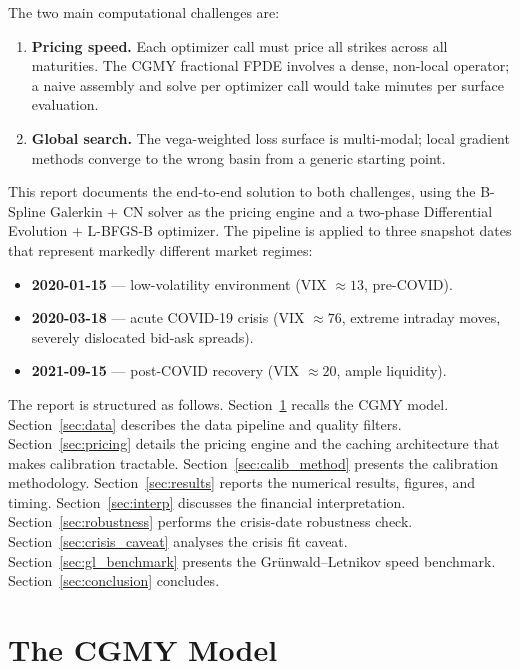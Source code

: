 \documentclass[11pt,a4paper]{article}
\begin{document}
The two main computational challenges are:
\begin{enumerate}[leftmargin=*]
  \item \textbf{Pricing speed.} Each optimizer call must price all strikes
        across all maturities.  The CGMY fractional FPDE involves a dense,
        non-local operator; a naive assembly and solve per optimizer call would
        take minutes per surface evaluation.
  \item \textbf{Global search.} The vega-weighted loss surface is multi-modal;
        local gradient methods converge to the wrong basin from a generic
        starting point.
\end{enumerate}

This report documents the end-to-end solution to both challenges, using the
B-Spline Galerkin + CN solver as the pricing engine and a two-phase
Differential Evolution + L-BFGS-B optimizer.
The pipeline is applied to three snapshot dates that represent markedly
different market regimes:
\begin{itemize}
  \item \textbf{2020-01-15} — low-volatility environment (VIX $\approx 13$,
        pre-COVID).
  \item \textbf{2020-03-18} — acute COVID-19 crisis (VIX $\approx 76$,
        extreme intraday moves, severely dislocated bid-ask spreads).
  \item \textbf{2021-09-15} — post-COVID recovery (VIX $\approx 20$,
        ample liquidity).
\end{itemize}

The report is structured as follows.
Section~\ref{sec:model} recalls the CGMY model.
Section~\ref{sec:data} describes the data pipeline and quality filters.
Section~\ref{sec:pricing} details the pricing engine and the caching
architecture that makes calibration tractable.
Section~\ref{sec:calib_method} presents the calibration methodology.
Section~\ref{sec:results} reports the numerical results, figures, and timing.
Section~\ref{sec:interp} discusses the financial interpretation.
Section~\ref{sec:robustness} performs the crisis-date robustness check.
Section~\ref{sec:crisis_caveat} analyses the crisis fit caveat.
Section~\ref{sec:gl_benchmark} presents the Gr\"{u}nwald--Letnikov
speed benchmark.
Section~\ref{sec:conclusion} concludes.

\section{The CGMY Model}
\label{sec:model}
\end{document}
